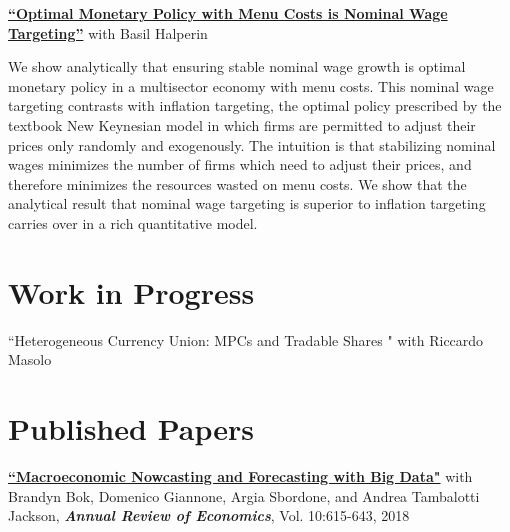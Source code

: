 \documentclass[margin,line]{res}                          %
\newenvironment{list1}{
	\begin{list}{\ding{113}}{%
			\setlength{\itemsep}{0in}
			\setlength{\parsep}{0in} \setlength{\parskip}{0in}
			\setlength{\topsep}{0in} \setlength{\partopsep}{0in}
			\setlength{\leftmargin}{0.17in}}}{\end{list}}
\begin{document}
\begin{resume}
\begin{list1}
		\item[] \href{https://danicaratelli.github.io/research/papers/OptimalMP_CaratelliHalperin.pdf}{\textbf{``Optimal Monetary Policy with Menu Costs is Nominal Wage Targeting''}} with Basil Halperin\smallskip
		\item[] We show analytically that ensuring stable nominal wage growth is optimal monetary policy in a multisector economy with menu costs. This nominal wage targeting contrasts with inflation targeting, the optimal policy prescribed by the textbook New Keynesian model in which firms are permitted to adjust their prices only randomly and exogenously. The intuition is that stabilizing nominal wages minimizes the number of firms which need to adjust their prices, and therefore minimizes the resources wasted on menu costs. We show that the analytical result that nominal wage targeting is superior to inflation targeting carries over in a rich quantitative model.
		\vspace{9pt}		
	\end{list1}
	
	\section{\sc Work in Progress}
	\begin{list1}
		\item[] ``Heterogeneous Currency Union: MPCs and Tradable Shares " with Riccardo Masolo \smallskip
	\end{list1}
	
	\section{\sc Published Papers}
	\begin{list1}
		\item[] \href{https://www.annualreviews.org/doi/abs/10.1146/annurev-economics-083120-111540}{\textbf{``Macroeconomic Nowcasting and Forecasting with Big Data"}} with  Brandyn Bok, Domenico Giannone, Argia Sbordone, and Andrea Tambalotti  Jackson, \textit{\textbf{Annual Review of Economics}}, Vol. 10:615-643, 2018 \smallskip
	\end{list1}
	
	

\end{resume}
\end{document}
